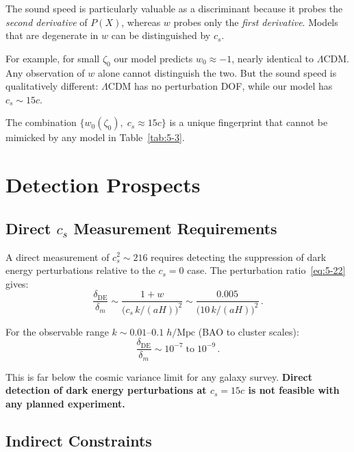 The sound speed is particularly valuable as a discriminant because it probes the \emph{second derivative} of $P(X)$, whereas $w$ probes only the \emph{first derivative}. Models that are degenerate in $w$ can be distinguished by $c_s$.

For example, for small $\zeta_0$ our model predicts $w_0 \approx -1$, nearly identical to $\Lambda$CDM. Any observation of $w$ alone cannot distinguish the two. But the sound speed is qualitatively different: $\Lambda$CDM has no perturbation DOF, while our model has $c_s \sim 15c$.

The combination $\{w_0(\zeta_0),\; c_s \approx 15c\}$ is a unique fingerprint that cannot be mimicked by any model in Table~\ref{tab:5-3}.

\section{Detection Prospects}
\label{sec:5-detection}

\subsection{Direct \texorpdfstring{$c_s$}{cs} Measurement Requirements}
\label{sec:5-direct}

A direct measurement of $c_s^2 \sim 216$ requires detecting the suppression of dark energy perturbations relative to the $c_s = 0$ case. The perturbation ratio~\eqref{eq:5-22} gives:
\begin{equation}
  \frac{\delta_\mathrm{DE}}{\delta_m}
    \sim \frac{1+w}{\bigl(c_s\,k/(aH)\bigr)^2}
    \sim \frac{0.005}{\bigl(10\,k/(aH)\bigr)^2}\,.
  \label{eq:5-26}
\end{equation}

For the observable range $k \sim 0.01$--$0.1\;h/\mathrm{Mpc}$ (BAO to cluster scales):
\begin{equation}
  \frac{\delta_\mathrm{DE}}{\delta_m} \sim 10^{-7}\;\text{to}\;10^{-9}\,.
  \label{eq:5-27}
\end{equation}

This is far below the cosmic variance limit for any galaxy survey. \textbf{Direct detection of dark energy perturbations at $c_s = 15c$ is not feasible with any planned experiment.}

\subsection{Indirect Constraints}
\label{sec:5-indirect}

